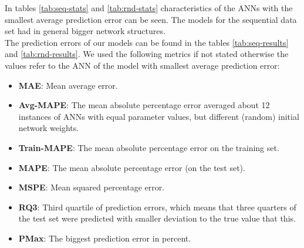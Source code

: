 \documentclass{superfri}
\begin{document}
In tables \ref{tab:seq-stats} and \ref{tab:rnd-stats} characteristics of the ANNs with the smallest average prediction error can be seen.
The models for the sequential data set had in general bigger network structures.
\\
The prediction errors of our models can be found in the tables \ref{tab:seq-results} and \ref{tab:rnd-results}.
We used the following metrics if not stated otherwise the values refer to the ANN of the model with smallest average prediction error:
\begin{itemize}
	\item \textbf{MAE}: Mean average error.
	\item \textbf{Avg-MAPE}: The mean absolute percentage error averaged about 12 instances of ANNs with equal parameter values, but different (random) initial network weights.
	\item \textbf{Train-MAPE}: The mean absolute percentage error on the training set. 
	\item \textbf{MAPE}: The mean absolute percentage error (on the test set).
	\item \textbf{MSPE}: Mean squared percentage error.
	\item \textbf{RQ3}: Third quartile of prediction errors, which means that three quarters of the test set were predicted with smaller deviation to the true value that this.
	\item \textbf{PMax}: The biggest prediction error in percent.
\end{itemize}
\end{document}
